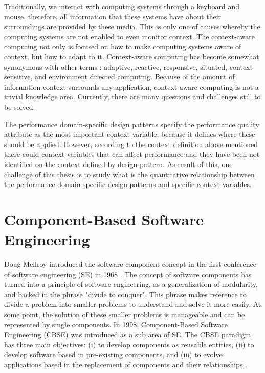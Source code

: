 Traditionally, we interact with computing systems through a keyboard and mouse, therefore, all information that these systems have about their surroundings are provided by these media. This is only one of causes whereby  the computing systems are not enabled to even monitor context. The context-aware computing not only is focused on how to make computing systems aware of context, but how to adapt to it.  Context-aware computing has become somewhat synonymous with other terms \cite{dey2016context}: adaptive, reactive, responsive, situated, context sensitive, and environment directed computing. Because of the amount of information context surrounds any application, context-aware computing is not a trivial knowledge area. Currently, there are many questions and challenges still to be solved.

The performance domain-specific design patterns specify the performance quality attribute as the most important context variable, because it defines where these should be applied. However, according to the context definition above mentioned there could context variables that can affect performance and they have been not identified on the context defined by design pattern.  As result of this, one challenge of this thesis is to study what is the quantitative relationship between the performance domain-specific design patterns and specific context variables.



\section {Component-Based Software Engineering}
Doug Mcllroy introduced the software component concept in the first conference of software engineering (SE) in 1968 \cite{softwareComponents}. The concept of software components has turned into a principle of software engineering, as a generalization of modularity, and backed in the phrase "divide to conquer". This phrase makes reference to divide a problem into smaller problems to understand and solve it more easily. At some point, the solution of these smaller problems is manageable and can be represented by single components. In 1998, Component-Based Software Engineering (CBSE) was introduced as a sub area of SE. The CBSE paradigm has three main objectives: (i) to develop components as reusable entities, (ii) to develop software based in pre-existing components, and (iii) to evolve applications based in the replacement of components and their relationships \cite{softwareComponents}. 

